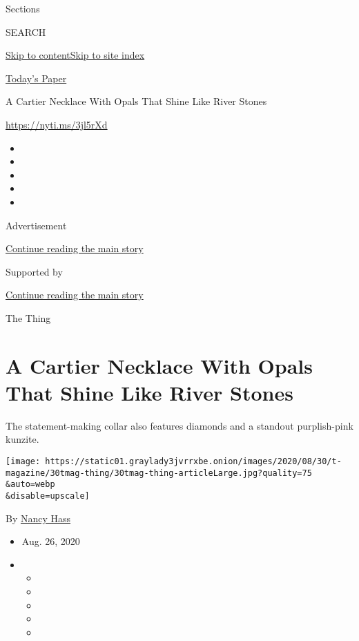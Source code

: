 Sections

SEARCH

\protect\hyperlink{site-content}{Skip to
content}\protect\hyperlink{site-index}{Skip to site index}

\href{https://myaccount.nytimes3xbfgragh.onion/auth/login?response_type=cookie\&client_id=vi}{}

\href{https://www.nytimes3xbfgragh.onion/section/todayspaper}{Today's
Paper}

A Cartier Necklace With Opals That Shine Like River Stones

\url{https://nyti.ms/3jl5rXd}

\begin{itemize}
\item
\item
\item
\item
\item
\end{itemize}

Advertisement

\protect\hyperlink{after-top}{Continue reading the main story}

Supported by

\protect\hyperlink{after-sponsor}{Continue reading the main story}

The Thing

\hypertarget{a-cartier-necklace-with-opals-that-shine-like-river-stones}{%
\section{A Cartier Necklace With Opals That Shine Like River
Stones}\label{a-cartier-necklace-with-opals-that-shine-like-river-stones}}

The statement-making collar also features diamonds and a standout
purplish-pink kunzite.

\texttt{[image: https://static01.graylady3jvrrxbe.onion/images/2020/08/30/t-magazine/30tmag-thing/30tmag-thing-articleLarge.jpg?quality=75\\\&auto=webp\\\&disable=upscale]}

By \href{https://www.nytimes3xbfgragh.onion/by/nancy-hass}{Nancy Hass}

\begin{itemize}
\item
  Aug. 26, 2020
\item
  \begin{itemize}
  \item
  \item
  \item
  \item
  \item
  \end{itemize}
\end{itemize}

